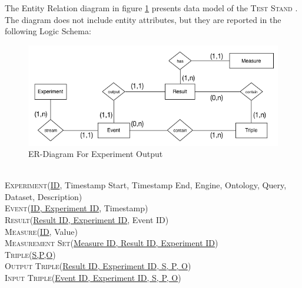 \noindent The Entity Relation diagram in figure \ref{fig:er} presents data model of the \textsc{Test Stand} . The diagram does not include entity attributes, but they are reported in the following Logic Schema:
\begin{figure}[tbh]
  \centering
	\includegraphics[width=\linewidth]{images/er-db}
	\caption{ER-Diagram For Experiment Output} 
  	\label{fig:er}
\end{figure}\\
\noindent\textsc{Experiment}(\underline{ID}, Timestamp Start, Timestamp End, Engine, Ontology, Query, Dataset, Description)\\
\textsc{Event}(\underline{ID, Experiment ID}, Timestamp)\\
\textsc{Result}(\underline{Result ID, Experiment ID}, Event ID)\\
\textsc{Measure}(\underline{ID}, Value)\\
\textsc{Measurement Set}(\underline{Measure ID, Result ID, Experiment ID})\\
\textsc{Triple}(\underline{S,P,O})\\
\textsc{Output Triple}(\underline{Result ID, Experiment ID, S, P, O})\\
\textsc{Input Triple}(\underline{Event ID, Experiment ID, S, P, O})\\

